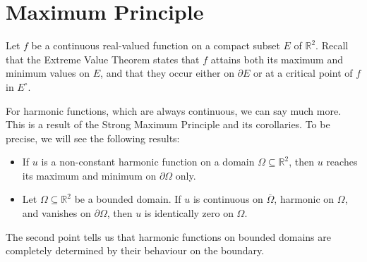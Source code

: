 \documentclass[10pt]{article}
\newcommand{\R}{\mathbb{R}}
\theoremstyle{newstyle}
\begin{document}
\newpage 
\section{Maximum Principle}

Let $f$ be a continuous real-valued function on a compact subset $E$ of $\R^2$. 
Recall that the Extreme Value Theorem states that $f$ attains both its maximum and 
minimum values on $E$, and that they occur either on $\partial E$ or at a critical 
point of $f$ in $E^\circ$. 

For harmonic functions, which are always continuous, we can say much more. This is a result 
of the Strong Maximum Principle and its corollaries. To be precise, we will see the following results:
\begin{itemize}
    \item If $u$ is a non-constant harmonic function on a domain $\Omega \subseteq \R^2$, then 
$u$ reaches its maximum and minimum on $\partial\Omega$ only.
    \item Let $\Omega \subseteq \R^2$ be a bounded domain. 
    If $u$ is continuous on $\overline\Omega$, harmonic on $\Omega$,
    and vanishes on $\partial\Omega$, then $u$ is identically zero on $\Omega$. 
\end{itemize} 
The second point tells us that harmonic functions on bounded domains are completely determined by their
behaviour on the boundary.
\end{document}
